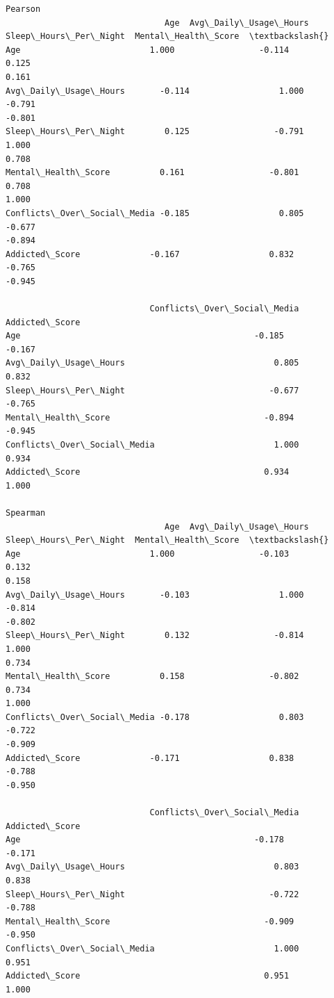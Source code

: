 \documentclass[11pt]{article}
\begin{document}
    \begin{Verbatim}[commandchars=\\\{\}]
Pearson
                                Age  Avg\_Daily\_Usage\_Hours
Sleep\_Hours\_Per\_Night  Mental\_Health\_Score  \textbackslash{}
Age                          1.000                 -0.114                  0.125
0.161
Avg\_Daily\_Usage\_Hours       -0.114                  1.000                 -0.791
-0.801
Sleep\_Hours\_Per\_Night        0.125                 -0.791                  1.000
0.708
Mental\_Health\_Score          0.161                 -0.801                  0.708
1.000
Conflicts\_Over\_Social\_Media -0.185                  0.805                 -0.677
-0.894
Addicted\_Score              -0.167                  0.832                 -0.765
-0.945

                             Conflicts\_Over\_Social\_Media  Addicted\_Score
Age                                               -0.185          -0.167
Avg\_Daily\_Usage\_Hours                              0.805           0.832
Sleep\_Hours\_Per\_Night                             -0.677          -0.765
Mental\_Health\_Score                               -0.894          -0.945
Conflicts\_Over\_Social\_Media                        1.000           0.934
Addicted\_Score                                     0.934           1.000

Spearman
                                Age  Avg\_Daily\_Usage\_Hours
Sleep\_Hours\_Per\_Night  Mental\_Health\_Score  \textbackslash{}
Age                          1.000                 -0.103                  0.132
0.158
Avg\_Daily\_Usage\_Hours       -0.103                  1.000                 -0.814
-0.802
Sleep\_Hours\_Per\_Night        0.132                 -0.814                  1.000
0.734
Mental\_Health\_Score          0.158                 -0.802                  0.734
1.000
Conflicts\_Over\_Social\_Media -0.178                  0.803                 -0.722
-0.909
Addicted\_Score              -0.171                  0.838                 -0.788
-0.950

                             Conflicts\_Over\_Social\_Media  Addicted\_Score
Age                                               -0.178          -0.171
Avg\_Daily\_Usage\_Hours                              0.803           0.838
Sleep\_Hours\_Per\_Night                             -0.722          -0.788
Mental\_Health\_Score                               -0.909          -0.950
Conflicts\_Over\_Social\_Media                        1.000           0.951
Addicted\_Score                                     0.951           1.000
    \end{Verbatim}
\end{document}
